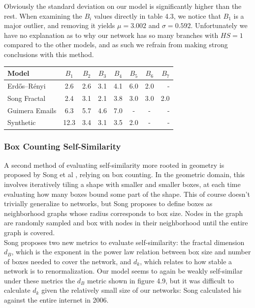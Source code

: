 \documentclass[12pt,twoside]{report}
\begin{document}
Obviously the standard deviation on our model is significantly higher than the rest. When examining the $B_i$ values directly in table 4.3, we notice that $B_1$ is a major outlier, and removing it yields $\mu = 3.002$ and $\sigma = 0.592$. Unfortunately we have no explanation as to why our network has so many branches with $HS = 1$ compared to the other models, and as such we refrain from making strong conclusions with this method. \\

\begin{center}
\begin{tabular}{l*{6}{c}r}
Model              & $B_1$ & $B_2$ & $B_3$ & $B_4$ & $B_5$ & $B_6$ & $B_7$ \\
\hline
Erdős–Rényi      & 2.6  & 2.6 & 3.1 & 4.1 & 6.0 & 2.0 & -  \\
Song Fractal      & 2.4  & 3.1 & 2.1 & 3.8 & 3.0 & 3.0 & 2.0  \\
Guimera Emails      & 6.3  & 5.7 & 4.6 & 7.0 & - & - & -  \\
Synthetic      & 12.3  & 3.4 & 3.1 & 3.5 & 2.0 & - & -  \\
\end{tabular}
\end{center}

\subsubsection{Box Counting Self-Similarity}

A second method of evaluating self-similarity more rooted in geometry is proposed by Song et al \cite{song2005self}, relying on box counting. In the geometric domain, this involves iteratively tiling a shape with smaller and smaller boxes, at each time evaluating how many boxes bound some part of the shape. This of course doesn't trivially generalize to networks, but Song proposes to define boxes as neighborhood graphs whose radius corresponds to box size. Nodes in the graph are randomly sampled and box with nodes in their neighborhood until the entire graph is covered. \\

Song proposes two new metrics to evaluate self-similarity: the fractal dimension $d_B$, which is the exponent in the power law relation between box size and number of boxes needed to cover the network, and $d_k$, which relates to how stable a network is to renormalization. Our model seems to again be weakly self-similar under these metrics the $d_B$ metric shown in figure 4.9, but it was difficult to calculate $d_k$ given the relatively small size of our networks: Song calculated his against the entire internet in 2006. \\
\end{document}
